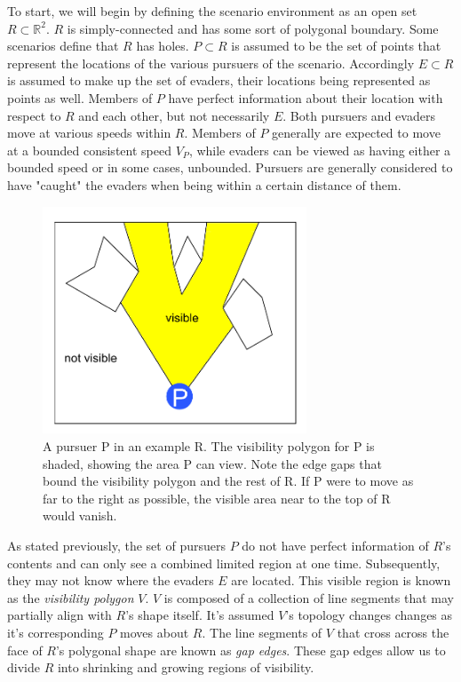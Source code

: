 \documentclass{article}
\begin{document}
To start, we will begin by defining the scenario environment as an open set \(R\subset\mathbb{R}^2\). \(R\) is simply-connected and has some sort of polygonal boundary. Some scenarios define that \(R\) has holes. \(P\subset R\) is assumed to be the set of points that represent the locations of the various pursuers of the scenario. Accordingly \(E\subset R\) is assumed to make up the set of evaders, their locations being represented as points as well. Members of \(P\) have perfect information about their location with respect to \(R\) and each other, but not necessarily \(E\). Both pursuers and evaders move at various speeds within \(R\). Members of \(P\) generally are expected to move at a bounded consistent speed \(V_P\), while evaders can be viewed as having either a bounded speed or in some cases, unbounded. \cite{limVis, robotics} Pursuers are generally considered to have "caught" the evaders when being within a certain distance of them.

\begin{figure}[htb]
\centering
\includegraphics[width=0.7\textwidth]{"visPoly"}
\caption{A pursuer P in an example R. The visibility polygon for P is shaded, showing the area P can view. Note the edge gaps that bound the visibility polygon and the rest of R. If P were to move as far to the right as possible, the visible area near to the top of R would vanish.}
\end{figure}

As stated previously, the set of pursuers \(P\) do not have perfect information of \(R\)'s contents and can only see a combined limited region at one time. Subsequently, they may not know where the evaders \(E\) are located. This visible region is known as the \emph{visibility polygon} \(V\). \(V\) is composed of a collection of line segments that may partially align with \(R\)'s shape itself. It's assumed \(V\)'s topology changes changes as it's corresponding \(P\) moves about \(R\). The line segments of \(V\) that cross across the face of \(R\)'s polygonal shape are known as \emph{gap edges}. These gap edges allow us to divide \(R\) into shrinking and growing regions of visibility. \cite{limVis, robotics}
\end{document}
